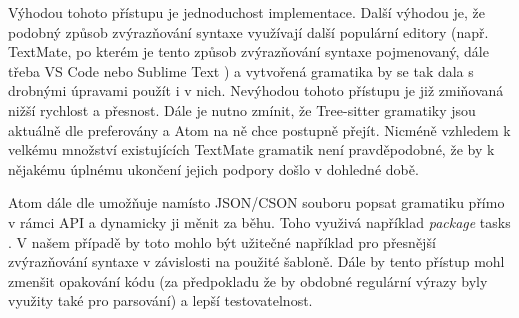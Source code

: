 Výhodou tohoto přístupu je jednoduchost implementace. Další výhodou je, že podobný způsob zvýrazňování syntaxe využívají
další populární editory (např. TextMate, po kterém je tento způsob zvýrazňování syntaxe pojmenovaný, dále třeba VS Code
\cite{vscode-docs} nebo Sublime Text \cite{sublime-text-docs}) a vytvořená gramatika by se tak dala s drobnými úpravami
použít i v nich. Nevýhodou tohoto přístupu je již zmiňovaná nižší rychlost a přesnost. Dále je nutno zmínit, že
Tree-sitter gramatiky jsou aktuálně dle \cite{atom-docs} preferovány a Atom na ně chce postupně přejít. Nicméně vzhledem
k velkému množství existujících TextMate gramatik není pravděpodobné, že by k nějakému úplnému ukončení jejich podpory
došlo v dohledné době.

Atom dále dle \cite{atom-docs} umožňuje namísto JSON/CSON souboru popsat gramatiku přímo v rámci API a dynamicky ji měnit
za běhu. Toho využivá například \textit{package} tasks \cite{atom-package-tasks}. V našem případě by toto mohlo být
užitečné například pro přesnější zvýrazňování syntaxe v závislosti na použité šabloně. Dále by tento přístup mohl
zmenšit opakování kódu (za předpokladu že by obdobné regulární výrazy byly využity také pro parsování) a lepší
testovatelnost.
